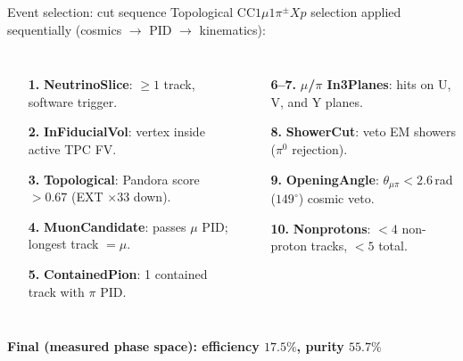 \documentclass[aspectratio=169,10pt]{beamer}
\begin{document}
\begin{frame}{Event selection: cut sequence}
  \footnotesize
  Topological CC$1\mu1\pi^\pm Xp$ selection applied sequentially (cosmics $\to$ PID $\to$ kinematics):
  \begin{columns}[T]
  \begin{enumerate}\setlength\itemsep{1pt}
    \item[\textbf{1.}] \textbf{NeutrinoSlice}: $\ge1$ track, software trigger.
    \item[\textbf{2.}] \textbf{InFiducialVol}: vertex inside active TPC FV.
    \item[\textbf{3.}] \textbf{Topological}: Pandora score $>0.67$ (EXT $\times33$ down).
    \item[\textbf{4.}] \textbf{MuonCandidate}: passes $\mu$ PID; longest track $=\mu$.
    \item[\textbf{5.}] \textbf{ContainedPion}: 1 contained track with $\pi$ PID.
  \end{enumerate}
  \begin{enumerate}\setlength\itemsep{1pt}
    \item[\textbf{6--7.}] \textbf{$\mu$/$\pi$ In3Planes}: hits on U, V, and Y planes.
    \item[\textbf{8.}] \textbf{ShowerCut}: veto EM showers ($\pi^0$ rejection).
    \item[\textbf{9.}] \textbf{OpeningAngle}: $\theta_{\mu\pi}<2.6$\,rad ($149^\circ$) cosmic veto.
    \item[\textbf{10.}] \textbf{Nonprotons}: $<4$ non-proton tracks, $<5$ total.
  \end{enumerate}
  \end{columns}
  \vspace{1mm}
\bigskip
  {\large \textbf{Final (measured phase space): efficiency $17.5\%$, purity $55.7\%$} }
\end{frame}
\end{document}
